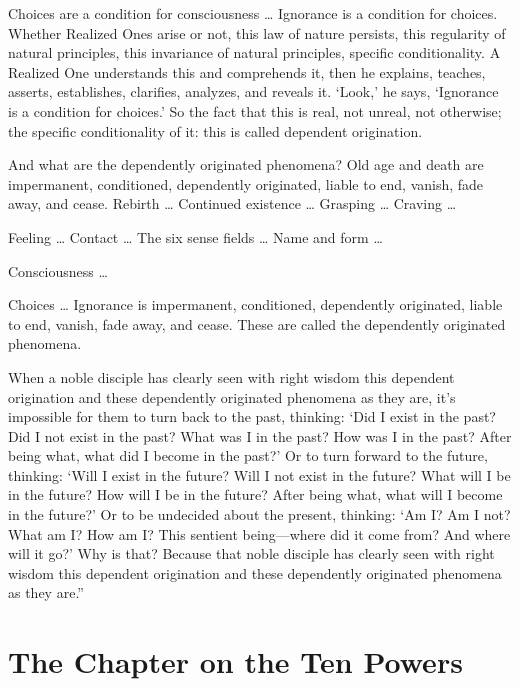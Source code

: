 \documentclass[12pt,openany]{book}%
\let\oldcontentsline\contentsline
\newcommand{\nopagecontentsline}[3]{\oldcontentsline{#1}{#2}{}}
\newcommand*{\tocchapterline}[1]{\bfseries\itshape{#1}}
\begin{document}
Choices are a condition for consciousness … Ignorance is a condition for choices. Whether Realized Ones arise or not, this law of nature persists, this regularity of natural principles, this invariance of natural principles, specific conditionality. A Realized One understands this and comprehends it, then he explains, teaches, asserts, establishes, clarifies, analyzes, and reveals it. ‘Look,’ he says, ‘Ignorance is a condition for choices.’ So the fact that this is real, not unreal, not otherwise; the specific conditionality of it: this is called dependent origination. 

And what are the dependently originated phenomena? Old age and death are impermanent, conditioned, dependently originated, liable to end, vanish, fade away, and cease. Rebirth … Continued existence … Grasping … Craving … 

Feeling … Contact … The six sense fields … Name and form … 

Consciousness … 

Choices … Ignorance is impermanent, conditioned, dependently originated, liable to end, vanish, fade away, and cease. These are called the dependently originated phenomena. 

When a noble disciple has clearly seen with right wisdom this dependent origination and these dependently originated phenomena as they are, it’s impossible for them to turn back to the past, thinking: ‘Did I exist in the past? Did I not exist in the past? What was I in the past? How was I in the past? After being what, what did I become in the past?’ Or to turn forward to the future, thinking: ‘Will I exist in the future? Will I not exist in the future? What will I be in the future? How will I be in the future? After being what, what will I become in the future?’ Or to be undecided about the present, thinking: ‘Am I? Am I not? What am I? How am I? This sentient being—where did it come from? And where will it go?’ Why is that? Because that noble disciple has clearly seen with right wisdom this dependent origination and these dependently originated phenomena as they are.” 

%
\chapter*{The Chapter on the Ten Powers }
\addcontentsline{toc}{chapter}{\tocchapterline{The Chapter on the Ten Powers }}
\addtocontents{toc}{\let\protect\contentsline\protect\oldcontentsline}
\end{document}
